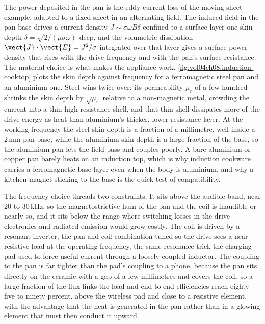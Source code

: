 The power deposited in the pan is the eddy-current loss of the moving-sheet
example, adapted to a fixed sheet in an alternating field. The induced field
in the pan base drives a current density $J \sim \sigma\omega B\delta$
confined to a surface layer one skin depth $\delta = \sqrt{2/(\mu\sigma
\omega)}$ deep, and the volumetric dissipation $\vect{J}\cdot\vect{E} =
J^{2}/\sigma$ integrated over that layer gives a surface power density that
rises with the drive frequency and with the pan's surface resistance. The
material choice is what makes the appliance work.
\cref{fig:vol04ch08:induction-cooktop} plots the skin depth against
frequency for a ferromagnetic steel pan and an aluminium one. Steel wins
twice over: its permeability $\mu_r$ of a few hundred shrinks the skin depth
by $\sqrt{\mu_r}$ relative to a non-magnetic metal, crowding the current
into a thin high-resistance shell, and that thin shell dissipates more of
the drive energy as heat than aluminium's thicker, lower-resistance layer.
At the working frequency the steel skin depth is a fraction of a millimetre,
well inside a $2\,\si{\milli\meter}$ pan base, while the aluminium skin
depth is a large fraction of the base, so the aluminium pan lets the field
pass and couples poorly. A bare aluminium or copper pan barely heats on an
induction top, which is why induction cookware carries a ferromagnetic base
layer even when the body is aluminium, and why a kitchen magnet sticking to
the base is the quick test of compatibility.



The frequency choice threads two constraints. It sits above the audible
band, near $20$ to $30\,\si{\kilo\hertz}$, so the magnetostrictive hum of
the pan and the coil is inaudible or nearly so, and it sits below the range
where switching losses in the drive electronics and radiated emission would
grow costly. The coil is driven by a resonant inverter, the pan-and-coil
combination tuned so the drive sees a near-resistive load at the operating
frequency, the same resonance trick the charging pad used to force useful
current through a loosely coupled inductor. The coupling to the pan is far
tighter than the pad's coupling to a phone, because the pan sits directly on
the ceramic with a gap of a few millimetres and covers the coil, so a large
fraction of the flux links the load and end-to-end efficiencies reach
eighty-five to ninety percent, above the wireless pad and close to a
resistive element, with the advantage that the heat is generated in the pan
rather than in a glowing element that must then conduct it upward.

